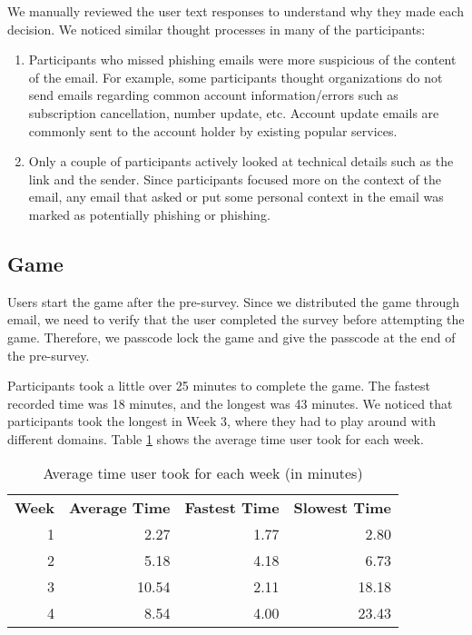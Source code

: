 We manually reviewed the user text responses to understand why they made each decision. We noticed similar thought processes in many of the participants:

\begin{enumerate}
    \item Participants who missed phishing emails were more suspicious of the content of the email. For example, some participants thought organizations do not send emails regarding common account information/errors such as subscription cancellation, number update, etc. Account update emails are commonly sent to the account holder by existing popular services.
    \item Only a couple of participants actively looked at technical details such as the link and the sender. Since participants focused more on the context of the email, any email that asked or put some personal context in the email was marked as potentially phishing or phishing.
\end{enumerate}

\subsection{Game}
Users start the game after the pre-survey. Since we distributed the game through email, we need to verify that the user completed the survey before attempting the game. Therefore, we passcode lock the game and give the passcode at the end of the pre-survey.

Participants took a little over 25 minutes to complete the game. The fastest recorded time was 18 minutes, and the longest was 43 minutes. We noticed that participants took the longest in Week 3, where they had to play around with different domains. Table \ref{tab:game_time} shows the average time user took for each week.

\begin{table}[!ht]
    \centering
    \begin{tabular}{r r r r }
        \hline
        \textbf{Week} & \textbf{Average Time} & \textbf{Fastest Time} & \textbf{Slowest Time} \\
        1             & 2.27                  & 1.77                  & 2.80                  \\
        2             & 5.18                  & 4.18                  & 6.73                  \\
        3             & 10.54                 & 2.11                  & 18.18                 \\
        4             & 8.54                  & 4.00                  & 23.43                 \\
        \hline
    \end{tabular}
    \caption{Average time user took for each week (in minutes)}
    \label{tab:game_time}
\end{table}

